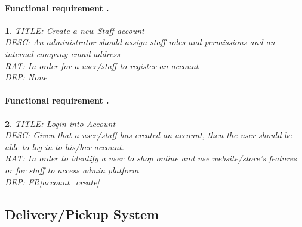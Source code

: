 \documentclass{scrreprt}
\theoremstyle{funreq}
\newtheorem{funreq}{}
\newcommand*{\reqref}[1]{\hyperref[#1]{FR\ref*{#1}}}
\begin{document}
\paragraph[]{Functional requirement .}
\begin{funreq}
	\label{account_createstaff}
	TITLE: Create a new Staff account\\
	DESC: An administrator should assign staff roles and permissions and an internal company email address\\
	RAT: In order for a user/staff to register an account\\
	DEP: None\\
\end{funreq}

\paragraph[]{Functional requirement .}
\begin{funreq}
	\label{account_login}
	TITLE: Login into Account\\
	DESC: Given that a user/staff has created an account, then the user should be able to log in to his/her account.\\
	RAT: In order to identify a user to shop online and use website/store’s features or for staff to access admin platform\\
	DEP: \reqref{account_create}
\end{funreq}


\subsection{Delivery/Pickup System}
\end{document}
